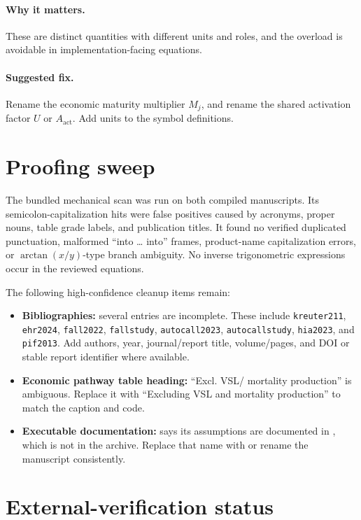 \documentclass[11pt]{article}
\begin{document}
\paragraph{Why it matters.}
These are distinct quantities with different units and roles, and the overload
is avoidable in implementation-facing equations.

\paragraph{Suggested fix.}
Rename the economic maturity multiplier \(M_j\), and rename the shared
activation factor \(U\) or \(A_{\mathrm{act}}\).  Add units to the symbol
definitions.

\section*{Proofing sweep}

The bundled mechanical scan was run on both compiled manuscripts.  Its
semicolon-capitalization hits were false positives caused by acronyms, proper
nouns, table grade labels, and publication titles.  It found no verified
duplicated punctuation, malformed ``into \ldots{} into'' frames, product-name
capitalization errors, or \(\arctan(x/y)\)-type branch ambiguity.  No inverse
trigonometric expressions occur in the reviewed equations.

The following high-confidence cleanup items remain:
\begin{itemize}
\item \textbf{Bibliographies:} several entries are incomplete.  These include
\texttt{kreuter211}, \texttt{ehr2024}, \texttt{fall2022},
\texttt{fallstudy}, \texttt{autocall2023}, \texttt{autocallstudy},
\texttt{hia2023}, and \texttt{pif2013}.  Add authors, year, journal/report
title, volume/pages, and DOI or stable report identifier where available.
\item \textbf{Economic pathway table heading:} ``Excl. VSL/ mortality
production'' is ambiguous.  Replace it with ``Excluding VSL and mortality
production'' to match the caption and code.
\item \textbf{Executable documentation:}
 says its assumptions are documented in
, which is not in the archive.  Replace that name
with  or rename the manuscript consistently.
\end{itemize}

\section*{External-verification status}
\end{document}
